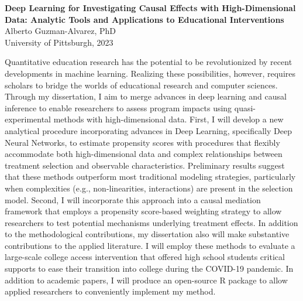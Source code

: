\pagestyle{plain}

\begin{center}

\textbf{Deep Learning for Investigating Causal Effects with High-Dimensional Data: Analytic Tools and Applications to Educational Interventions}\\
        Alberto Guzman-Alvarez, PhD\\
        University of Pittsburgh, 2023\\
    \end{center}
       \vspace*{3\baselineskip}

Quantitative education research has the potential to be revolutionized by recent developments in machine learning. Realizing these possibilities, however, requires scholars to bridge the worlds of educational research and computer sciences. Through my dissertation, I aim to merge advances in deep learning and causal inference to enable researchers to assess program impacts using quasi-experimental methods with high-dimensional data. First, I will develop a new analytical procedure incorporating advances in Deep Learning, specifically Deep Neural Networks, to estimate propensity scores with procedures that flexibly accommodate both high-dimensional data and complex relationships between treatment selection and observable characteristics. Preliminary results suggest that these methods outperform most traditional modeling strategies, particularly when complexities (e.g., non-linearities, interactions) are present in the selection model. Second, I will incorporate this approach into a causal mediation framework that employs a propensity score-based weighting strategy to allow researchers to test potential mechanisms underlying treatment effects. In addition to the methodological contributions, my dissertation also will make substantive contributions to the applied literature. I will employ these methods to evaluate a large-scale college access intervention that offered high school students critical supports to ease their transition into college during the COVID-19 pandemic. In addition to academic papers, I will produce an open-source R package to allow applied researchers to conveniently implement my method.

\newpage